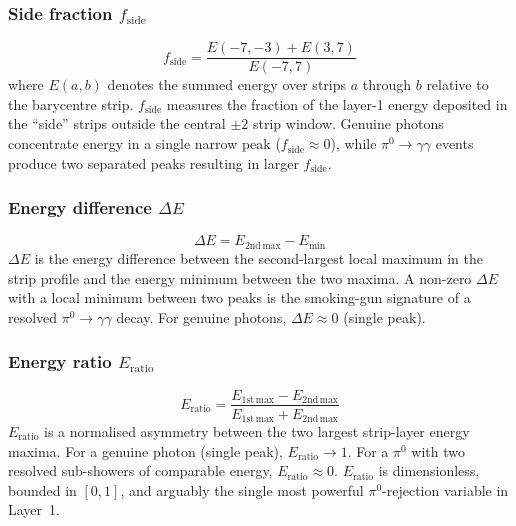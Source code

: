 \documentclass[11pt,a4paper]{article}
\newcommand{\fside}{f_{\mathrm{side}}}
\newcommand{\dE}{\Delta E}
\newcommand{\Eratio}{E_{\mathrm{ratio}}}
\begin{document}
\subsubsection{Side fraction \texorpdfstring{$\fside$}{fside}}

\begin{equation}
  \fside = \frac{
    E(-7, -3) + E(3, 7)}{E(-7, 7)}
  \label{eq:fside}
\end{equation}
where $E(a, b)$ denotes the summed energy over strips $a$ through
$b$ relative to the barycentre strip.  $\fside$ measures the
fraction of the layer-1 energy deposited in the ``side'' strips
outside the central $\pm 2$ strip window.  Genuine photons
concentrate energy in a single narrow peak ($\fside \approx 0$),
while $\pi^0 \to \gamma\gamma$ events produce two separated peaks
resulting in larger $\fside$.

\subsubsection{Energy difference \texorpdfstring{$\dE$}{Delta E}}

\begin{equation}
  \dE = E_\mathrm{2nd\,max} - E_\mathrm{min}
  \label{eq:deltae}
\end{equation}
$\dE$ is the energy difference between the second-largest local
maximum in the strip profile and the energy minimum between the
two maxima.  A non-zero $\dE$ with a local minimum between two
peaks is the smoking-gun signature of a resolved
$\pi^0 \to \gamma\gamma$ decay.  For genuine photons,
$\dE \approx 0$ (single peak).

\subsubsection{Energy ratio \texorpdfstring{$\Eratio$}{Eratio}}

\begin{equation}
  \Eratio = \frac{E_\mathrm{1st\,max} - E_\mathrm{2nd\,max}}
                  {E_\mathrm{1st\,max} + E_\mathrm{2nd\,max}}
  \label{eq:eratio}
\end{equation}
$\Eratio$ is a normalised asymmetry between the two largest
strip-layer energy maxima.  For a genuine photon (single peak),
$\Eratio \to 1$.  For a $\pi^0$ with two resolved sub-showers of
comparable energy, $\Eratio \approx 0$.  $\Eratio$ is dimensionless,
bounded in $[0, 1]$, and arguably the single most powerful
$\pi^0$-rejection variable in Layer~1.
\end{document}
